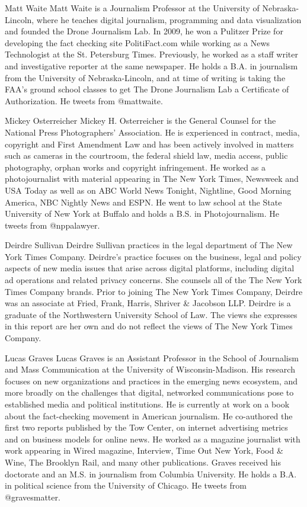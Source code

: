 \begin{itemize}
Matt Waite
Matt Waite is a Journalism Professor at the University of Nebraska-Lincoln,
where he teaches digital journalism, programming and data visualization
and founded the Drone Journalism Lab.
In 2009, he won a Pulitzer Prize for developing the fact checking site
PolitiFact.com while working as a News Technologist at the St. Petersburg
Times. Previously, he worked as a staff writer and investigative reporter at
the same newspaper.
He holds a B.A. in journalism from the University of Nebraska-Lincoln, and
at time of writing is taking the FAA's ground school classes to get The Drone
Journalism Lab a Certificate of Authorization.
He tweets from @mattwaite.


Mickey Osterreicher
Mickey H. Osterreicher is the General Counsel for the National Press Photographers'
Association. He is experienced in contract, media, copyright
and First Amendment Law and has been actively involved in matters such
as cameras in the courtroom, the federal shield law, media access, public
photography, orphan works and copyright infringement.
He worked as a photojournalist with material appearing in The New York
Times, Newsweek and USA Today as well as on ABC World News Tonight,
Nightline, Good Morning America, NBC Nightly News and ESPN.
He went to law school at the State University of New York at Buffalo and
holds a B.S. in Photojournalism.
He tweets from @nppalawyer.


Deirdre Sullivan
Deirdre Sullivan practices in the legal department of The New York
Times Company.
Deirdre's practice focuses on the business, legal and policy aspects of new
media issues that arise across digital platforms, including digital ad operations
and related privacy concerns. She counsels all of the The New York
Times Company brands.
Prior to joining The New York Times Company, Deirdre was an associate at
Fried, Frank, Harris, Shriver & Jacobson LLP.
Deirdre is a graduate of the Northwestern University School of Law.
The views she expresses in this report are her own and do not reflect the
views of The New York Times Company.


Lucas Graves
Lucas Graves is an Assistant Professor in the School of Journalism and
Mass Communication at the University of Wisconsin-Madison. His
research focuses on new organizations and practices in the emerging news
ecosystem, and more broadly on the challenges that digital, networked
communications pose to established media and political institutions.
He is currently at work on a book about the fact-checking movement in
American journalism.
He co-authored the first two reports published by the Tow Center, on
internet advertising metrics and on business models for online news. He
worked as a magazine journalist with work appearing in Wired magazine,
Interview, Time Out New York, Food & Wine, The Brooklyn Rail, and many
other publications.
Graves received his doctorate and an M.S. in journalism from Columbia
University. He holds a B.A. in political science from the University
of Chicago.
He tweets from @gravesmatter.



\end{itemize}
